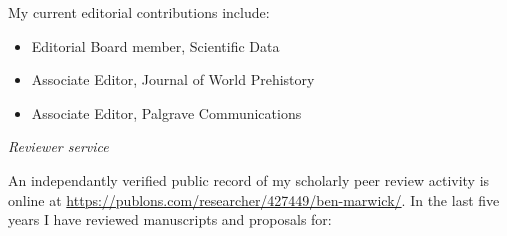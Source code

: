 \medskip

My current editorial contributions include:

\begin{itemize}[noitemsep, font=$\bullet$\scshape\bfseries]
\item Editorial Board member, Scientific Data
\item Associate Editor, Journal of World Prehistory
\item Associate Editor, Palgrave Communications 
\end{itemize}

\medskip

\noindent\emph{Reviewer service\vspace{0.01in}}

\medskip

An independantly verified public record of my scholarly peer review activity is online at \href{https://publons.com/researcher/427449/ben-marwick}{https://publons.com/researcher/427449/ben-marwick/}. In the last five years I have reviewed manuscripts and proposals for:

